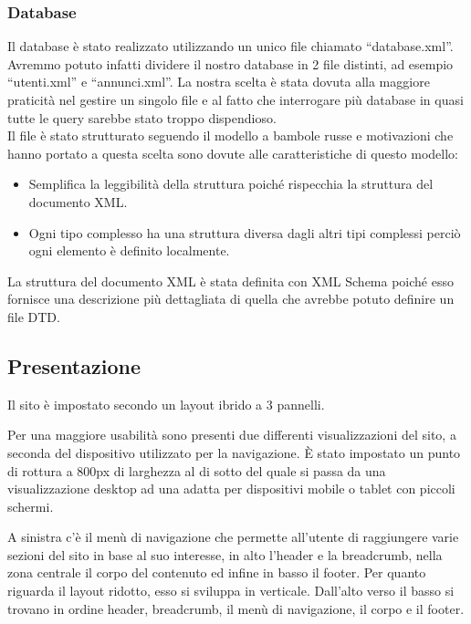 \documentclass[12pt]{article}
\begin{document}
	
		\subsubsection{Database}
		Il database è stato realizzato utilizzando un unico file chiamato “database.xml”.
		Avremmo potuto infatti dividere il nostro database in 2 file distinti, ad esempio “utenti.xml” e “annunci.xml”.
		La nostra scelta è stata dovuta alla maggiore praticità nel gestire un singolo file e al fatto che interrogare più database in quasi tutte le query sarebbe stato troppo dispendioso.\\
		Il file è stato strutturato seguendo il modello a bambole russe e motivazioni che hanno portato a questa scelta sono dovute alle caratteristiche di questo modello:
		
		\begin{itemize}
			\item Semplifica la leggibilità della struttura poiché rispecchia la struttura del documento XML.
			\item Ogni tipo complesso ha una struttura diversa dagli altri tipi complessi perciò ogni elemento è definito localmente.
		\end{itemize}
		
		La struttura del documento XML è stata definita con XML Schema poiché esso fornisce una descrizione più dettagliata di quella che avrebbe potuto definire un file DTD.

	\subsection{Presentazione}
	
	Il sito è impostato secondo un layout ibrido a 3 pannelli.
	
	Per una maggiore usabilità sono presenti due differenti visualizzazioni del sito, a seconda del dispositivo utilizzato per la navigazione.
	È stato impostato un punto di rottura a 800px di larghezza al di sotto del quale si passa da una visualizzazione desktop ad una adatta per dispositivi mobile o tablet con piccoli schermi.
	
	A sinistra c'è il menù di navigazione che permette all’utente di raggiungere varie sezioni del sito in base al suo interesse, in alto l'header e la breadcrumb, nella zona centrale il corpo del contenuto ed infine in basso il footer.
	Per quanto riguarda il layout ridotto, esso si sviluppa in verticale. Dall’alto verso il basso si trovano in ordine header, breadcrumb, il menù di navigazione, il corpo e il footer.
		
\end{document}
